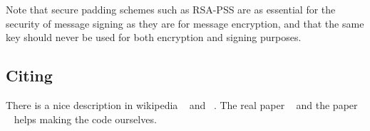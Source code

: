 Note that secure padding schemes such as RSA-PSS are as essential for the security of message signing as they are for message encryption, and that the same key should never be used for both encryption and signing purposes.

\subsection{Citing}
There is a nice description in wikipedia ~\cite{wiki_rsa} and ~\cite{geeks4geeks_rsa}. The real paper ~\cite{rsa_rsa} and the paper ~\cite{milanov_rsa} helps making the code ourselves.
